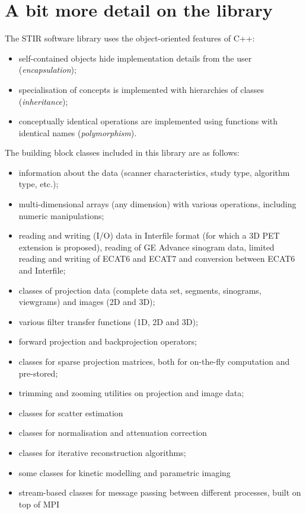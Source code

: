 \documentclass{article}
\begin{document}
\section{
A bit more detail on the library}

The STIR software library uses the object-oriented features of 
C++:

\begin{itemize}

\item self-contained objects hide implementation details from the user 
(\textit{encapsulation});
\item specialisation of concepts is implemented with hierarchies 
of classes (\textit{inheritance});
\item conceptually identical operations are implemented using 
functions with identical names (\textit{polymorphism}).
\end{itemize}

The building block classes included in this library are as follows:

\begin{itemize}
\item information about the data (scanner characteristics, study type, 
algorithm type, etc.);
\item multi-dimensional arrays (any dimension) with various 
operations, including numeric manipulations;
\item reading and writing (I/O) data in Interfile format (for 
which a 3D PET extension is proposed), reading of GE Advance 
sinogram data, limited reading and writing of ECAT6 and ECAT7 
and conversion between ECAT6 and Interfile;
\item classes of projection data (complete data set, segments, 
sinograms, viewgrams) and images (2D and 3D);
\item various filter transfer functions (1D, 2D and 3D);
\item forward projection and backprojection operators;
\item classes for sparse projection matrices, both for on-the-fly 
computation and pre-stored;
\item trimming and zooming utilities on projection and image 
data;
\item classes for scatter estimation
\item classes for normalisation and attenuation correction
\item classes for iterative reconstruction algorithms;
\item some classes for kinetic modelling and parametric imaging
\item stream-based classes for message passing between different 
processes, built on top of MPI
\end{itemize}
\end{document}
